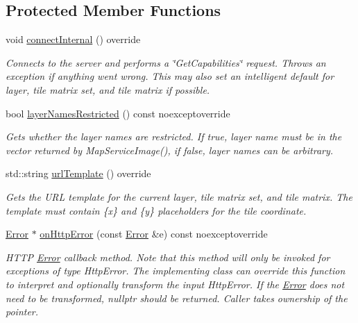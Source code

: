 \subsection*{Protected Member Functions}
\begin{DoxyCompactItemize}
\item 
void \hyperlink{classdg_1_1deepcore_1_1imagery_1_1_map_box_client_aa46bb7e4f7f6b83810c2e80cef034fe8}{connect\+Internal} () override
\begin{DoxyCompactList}\small\item\em Connects to the server and performs a \char`\"{}\+Get\+Capabilities\char`\"{} request. Throws an exception if anything went wrong. This may also set an intelligent default for layer, tile matrix set, and tile matrix if possible. \end{DoxyCompactList}\item 
bool \hyperlink{classdg_1_1deepcore_1_1imagery_1_1_map_box_client_a86d236c1fee402774a2abbfa06512f97}{layer\+Names\+Restricted} () const noexceptoverride
\begin{DoxyCompactList}\small\item\em Gets whether the layer names are restricted. If true, layer name must be in the vector returned by Map\+Service\+Image(), if false, layer names can be arbitrary. \end{DoxyCompactList}\item 
std\+::string \hyperlink{classdg_1_1deepcore_1_1imagery_1_1_map_box_client_a15e0db91e958c17f4fa133fff342e481}{url\+Template} () override
\begin{DoxyCompactList}\small\item\em Gets the U\+RL template for the current layer, tile matrix set, and tile matrix. The template must contain \{x\} and \{y\} placeholders for the tile coordinate. \end{DoxyCompactList}\item 
\hyperlink{classdg_1_1deepcore_1_1_error}{Error} $\ast$ \hyperlink{classdg_1_1deepcore_1_1imagery_1_1_map_box_client_a0767d558b44e4ed5c70af2e92e09d6bb}{on\+Http\+Error} (const \hyperlink{classdg_1_1deepcore_1_1_error}{Error} \&e) const noexceptoverride
\begin{DoxyCompactList}\small\item\em H\+T\+TP \hyperlink{classdg_1_1deepcore_1_1_error}{Error} callback method. Note that this method will only be invoked for exceptions of type Http\+Error. The implementing class can override this function to interpret and optionally transform the input Http\+Error. If the \hyperlink{classdg_1_1deepcore_1_1_error}{Error} does not need to be transformed, nullptr should be returned. Caller takes ownership of the pointer. \end{DoxyCompactList}\end{DoxyCompactItemize}



